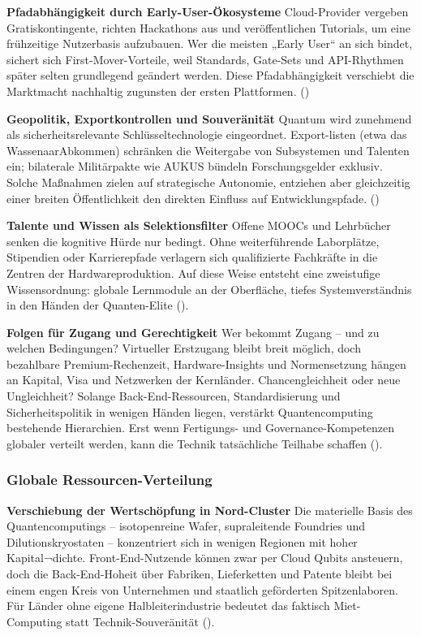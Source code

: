 {\textbf{Pfadabhängigkeit durch Early-User-Ökosysteme}
Cloud-Provider vergeben Gratiskontingente, richten Hackathons aus und veröffentlichen Tutorials, um eine frühzeitige Nutzerbasis aufzubauen. Wer die meisten „Early User“ an sich bindet, sichert sich First-Mover-Vorteile, weil Standards, Gate-Sets und API-Rhythmen später selten grundlegend geändert werden. Diese Pfadabhängigkeit verschiebt die Marktmacht nachhaltig zugunsten der ersten Plattformen. (\cite{seskirDemocratizationQuantumTechnologies2022})

\textbf{Geopolitik, Exportkontrollen und Souveränität}
Quantum wird zunehmend als sicherheitsrelevante Schlüsseltechnologie eingeordnet. Export-listen (etwa das WassenaarAbkommen) schränken die Weitergabe von Subsystemen und Talenten ein; bilaterale Militärpakte wie AUKUS bündeln Forschungsgelder exklusiv. Solche Maßnahmen zielen auf strategische Autonomie, entziehen aber gleichzeitig einer breiten Öffentlichkeit den direkten Einfluss auf Entwicklungspfade. (\cite{seskirDemocratizationQuantumTechnologies2022})

\textbf{Talente und Wissen als Selektionsfilter}
Offene MOOCs und Lehrbücher senken die kognitive Hürde nur bedingt. Ohne weiterführende Laborplätze, Stipendien oder Karrierepfade verlagern sich qualifizierte Fachkräfte in die Zentren der Hardwareproduktion. Auf diese Weise entsteht eine zweistufige Wissensordnung: globale Lernmodule an der Oberfläche, tiefes Systemverständnis in den Händen der Quanten-Elite (\cite{seskirDemocratizationQuantumTechnologies2022}).

\textbf{Folgen für Zugang und Gerechtigkeit} Wer bekommt Zugang – und zu welchen Bedingungen? Virtueller Erstzugang bleibt breit möglich, doch bezahlbare Premium-Rechenzeit, Hardware-Insights und Normensetzung hängen an Kapital, Visa und Netzwerken der Kernländer.
Chancengleichheit oder neue Ungleichheit?
Solange Back-End-Ressourcen, Standardisierung und Sicherheitspolitik in wenigen Händen liegen, verstärkt Quantencomputing bestehende Hierarchien. Erst wenn Fertigungs- und Governance-Kompetenzen globaler verteilt werden, kann die Technik tatsächliche Teilhabe schaffen (\cite{seskirDemocratizationQuantumTechnologies2022}).


\subsubsection{Globale Ressourcen-Verteilung}
\textbf{Verschiebung der Wertschöpfung in Nord-Cluster}
Die materielle Basis des Quantencomputings – isotopenreine Wafer, supraleitende Foundries und Dilutionskryostaten – konzentriert sich in wenigen Regionen mit hoher Kapital¬dichte. Front-End-Nutzende können zwar per Cloud Qubits ansteuern, doch die Back-End-Hoheit über Fabriken, Lieferketten und Patente bleibt bei einem engen Kreis von Unternehmen und staatlich geförderten Spitzenlaboren. Für Länder ohne eigene Halbleiterindustrie bedeutet das faktisch Miet-Computing statt Technik-Souveränität (\cite{seskirDemocratizationQuantumTechnologies2022}).

}
